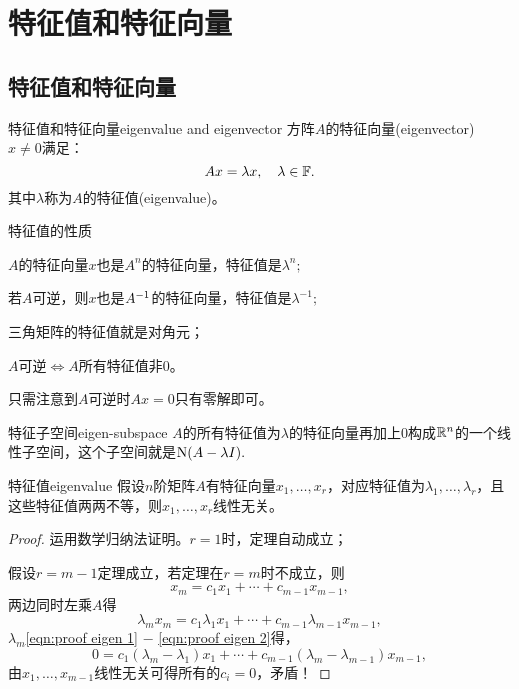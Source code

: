 
\chapter{特征值和特征向量}
\section{特征值和特征向量}
\begin{definition}{特征值和特征向量}{eigenvalue and eigenvector}
	方阵$A$的特征向量(eigenvector)~$x\neq 0$满足：
	\[
		Ax=\lambda x,\quad\lambda\in\mathbb F.
	\]
	其中$\lambda$称为$A$的特征值(eigenvalue)。
\end{definition}
\begin{theorem}{特征值的性质}{}
	\begin{compactenum}
		\item $A$的特征向量$x$也是$A^n$的特征向量，特征值是$\lambda^n;$
		\item 若$A$可逆，则$x$也是$A^{-1}$的特征向量，特征值是$\lambda^{-1};$
		\item 三角矩阵的特征值就是对角元；
		\item $A$可逆$\iff A$所有特征值非0。
		
		只需注意到$A$可逆时$Ax=0$只有零解即可。
	\end{compactenum}
\end{theorem}
\begin{definition}{特征子空间}{eigen-subspace}
	$A$的所有特征值为$\lambda$的特征向量再加上0构成$\mathbb R^n$的一个线性子空间，这个子空间就是$\operatorname{N}(A-\lambda I).$
\end{definition}
\begin{theorem}{特征值}{eigenvalue}
	假设$n$阶矩阵$A$有特征向量$x_1,\ldots,x_r$，对应特征值为$\lambda_1,\ldots,\lambda_r$，且这些特征值两两不等，则$x_1,\ldots,x_r$线性无关。
\end{theorem}
\begin{proof}
	运用数学归纳法证明。$r=1$时，定理自动成立；
	
	假设$r=m-1$定理成立，若定理在$r=m$时不成立，则
	\begin{equation}
		\label{eqn:proof eigen 1}
		x_m=c_1x_1+\cdots+c_{m-1}x_{m-1},\tag{$\ast$}
	\end{equation}
	两边同时左乘$A$得
	\begin{equation}
		\label{eqn:proof eigen 2}
		\lambda_mx_m=c_1\lambda_1x_1+\cdots+c_{m-1}\lambda_{m-1}x_{m-1},\tag{$\ast\ast$}
	\end{equation}
	$\lambda_m$\eqref{eqn:proof eigen 1} $-$ \eqref{eqn:proof eigen 2}得，
	\[
		0=c_1(\lambda_m-\lambda_1)x_1+\cdots+c_{m-1}(\lambda_m-\lambda_{m-1})x_{m-1},
	\]
	由$x_1,\ldots,x_{m-1}$线性无关可得所有的$c_i=0$，矛盾！
\end{proof}
